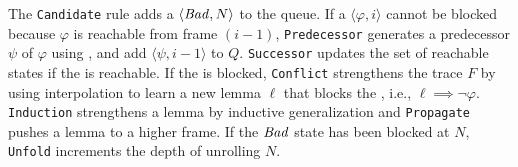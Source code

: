 The \texttt{Candidate} rule adds a \pob $\langle \mathit{Bad}, N \rangle$ to
the queue. If a \pob $\langle \varphi, i \rangle$ cannot be blocked because
$\varphi$ is reachable from frame $(i-1)$, \texttt{Predecessor}
generates a predecessor $\psi$ of $\varphi$ using \getP, and add $\langle \psi,
i-1 \rangle$ to $Q$. \texttt{Successor} updates the set of reachable
states if the \pob is reachable. If the \pob is blocked, \texttt{Conflict}
strengthens the trace $F$ by using interpolation to learn a new lemma
$\ell$ that blocks the \pob, i.e., $\ell \implies \neg \varphi$. \texttt{Induction} 
strengthens a lemma by inductive generalization and \texttt{Propagate} pushes a lemma to a higher frame. If the $\mathit{Bad}$ state
has been blocked at $N$, \texttt{Unfold} increments the depth of unrolling $N$.
\begin{algorithm2e}[t]
  \SetAlgoNoLine
  \LinesNotNumbered
\end{algorithm2e}
